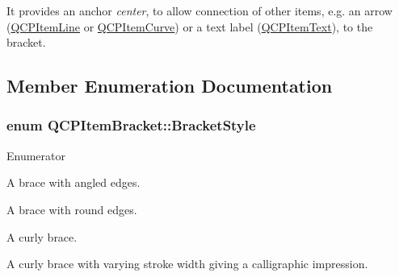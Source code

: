 It provides an anchor {\itshape center}, to allow connection of other items, e.\-g. an arrow (\hyperlink{classQCPItemLine}{Q\-C\-P\-Item\-Line} or \hyperlink{classQCPItemCurve}{Q\-C\-P\-Item\-Curve}) or a text label (\hyperlink{classQCPItemText}{Q\-C\-P\-Item\-Text}), to the bracket. 

\subsection{Member Enumeration Documentation}
\hypertarget{classQCPItemBracket_a7ac3afd0b24a607054e7212047d59dbd}{
\subsubsection[{Bracket\-Style}]{\setlength{\rightskip}{0pt plus 5cm}enum {\bf Q\-C\-P\-Item\-Bracket\-::\-Bracket\-Style}}}\label{classQCPItemBracket_a7ac3afd0b24a607054e7212047d59dbd}
\begin{Desc}
\item[Enumerator]\par
\begin{description}
\item[{\em 
\hypertarget{classQCPItemBracket_a7ac3afd0b24a607054e7212047d59dbda7f9df4a7359bfe3dac1dbe4ccf5d220c}{bs\-Square}\label{classQCPItemBracket_a7ac3afd0b24a607054e7212047d59dbda7f9df4a7359bfe3dac1dbe4ccf5d220c}
}]A brace with angled edges. \item[{\em 
\hypertarget{classQCPItemBracket_a7ac3afd0b24a607054e7212047d59dbda394627b0830a26ee3e0a02ca67a9f918}{bs\-Round}\label{classQCPItemBracket_a7ac3afd0b24a607054e7212047d59dbda394627b0830a26ee3e0a02ca67a9f918}
}]A brace with round edges. \item[{\em 
\hypertarget{classQCPItemBracket_a7ac3afd0b24a607054e7212047d59dbda5024ce4023c2d8de4221f1cd4816acd8}{bs\-Curly}\label{classQCPItemBracket_a7ac3afd0b24a607054e7212047d59dbda5024ce4023c2d8de4221f1cd4816acd8}
}]A curly brace. \item[{\em 
\hypertarget{classQCPItemBracket_a7ac3afd0b24a607054e7212047d59dbda8f29f5ef754e2dc9a9efdedb2face0f3}{bs\-Calligraphic}\label{classQCPItemBracket_a7ac3afd0b24a607054e7212047d59dbda8f29f5ef754e2dc9a9efdedb2face0f3}
}]A curly brace with varying stroke width giving a calligraphic impression. \end{description}
\end{Desc}


